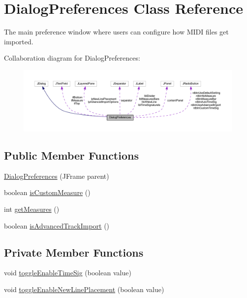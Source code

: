 \hypertarget{classcom_1_1lclion_1_1midigui_1_1_dialog_preferences}{\section{Dialog\+Preferences Class Reference}
\label{classcom_1_1lclion_1_1midigui_1_1_dialog_preferences}
}


The main preference window where users can configure how M\+I\+D\+I files get imported.  




Collaboration diagram for Dialog\+Preferences\+:\nopagebreak
\begin{figure}[H]
\begin{center}
\leavevmode
\includegraphics[width=350pt]{classcom_1_1lclion_1_1midigui_1_1_dialog_preferences__coll__graph}
\end{center}
\end{figure}
\subsection*{Public Member Functions}
\begin{DoxyCompactItemize}
\item 
\hyperlink{classcom_1_1lclion_1_1midigui_1_1_dialog_preferences_a3a976528242fb285edfa4844685b2682}{Dialog\+Preferences} (J\+Frame parent)
\item 
boolean \hyperlink{classcom_1_1lclion_1_1midigui_1_1_dialog_preferences_a7550ebb9d4b246937d72d6967e5c1c81}{is\+Custom\+Measure} ()
\item 
int \hyperlink{classcom_1_1lclion_1_1midigui_1_1_dialog_preferences_aecf15bd6d5f5cb5cc99fc780b0f992d9}{get\+Measures} ()
\item 
boolean \hyperlink{classcom_1_1lclion_1_1midigui_1_1_dialog_preferences_a9db6e6d7e71ab42a67aa837f223ba8e1}{is\+Advanced\+Track\+Import} ()
\end{DoxyCompactItemize}
\subsection*{Private Member Functions}
\begin{DoxyCompactItemize}
\item 
void \hyperlink{classcom_1_1lclion_1_1midigui_1_1_dialog_preferences_a67110efd36dc5fb48cd3086a11e39247}{toggle\+Enable\+Time\+Sig} (boolean value)
\item 
void \hyperlink{classcom_1_1lclion_1_1midigui_1_1_dialog_preferences_ab06a00ad2b6aba181568158e22a6490d}{toggle\+Enable\+New\+Line\+Placement} (boolean value)
\end{DoxyCompactItemize}

